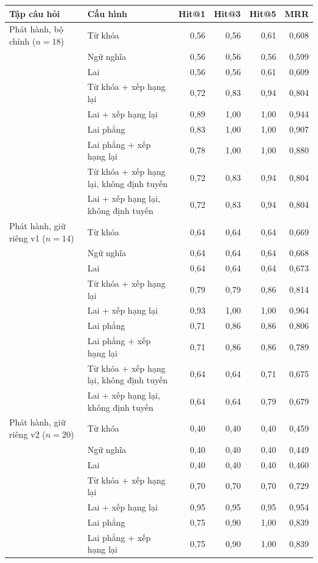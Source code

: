 \small
\begin{tabular}{@{}llrrrr@{}}
\toprule
Tập câu hỏi & Cấu hình & Hit@1 & Hit@3 & Hit@5 & MRR \\
\midrule
Phát hành, bộ chỉnh ($n=18$) & Từ khóa & 0,56 & 0,56 & 0,61 & 0,608 \\
 & Ngữ nghĩa & 0,56 & 0,56 & 0,56 & 0,599 \\
 & Lai & 0,56 & 0,56 & 0,61 & 0,609 \\
 & Từ khóa + xếp hạng lại & 0,72 & 0,83 & 0,94 & 0,804 \\
 & Lai + xếp hạng lại & 0,89 & 1,00 & 1,00 & 0,944 \\
 & Lai phẳng & 0,83 & 1,00 & 1,00 & 0,907 \\
 & Lai phẳng + xếp hạng lại & 0,78 & 1,00 & 1,00 & 0,880 \\
 & Từ khóa + xếp hạng lại, không định tuyến & 0,72 & 0,83 & 0,94 & 0,804 \\
 & Lai + xếp hạng lại, không định tuyến & 0,72 & 0,83 & 0,94 & 0,804 \\
\midrule
Phát hành, giữ riêng v1 ($n=14$) & Từ khóa & 0,64 & 0,64 & 0,64 & 0,669 \\
 & Ngữ nghĩa & 0,64 & 0,64 & 0,64 & 0,668 \\
 & Lai & 0,64 & 0,64 & 0,64 & 0,673 \\
 & Từ khóa + xếp hạng lại & 0,79 & 0,79 & 0,86 & 0,814 \\
 & Lai + xếp hạng lại & 0,93 & 1,00 & 1,00 & 0,964 \\
 & Lai phẳng & 0,71 & 0,86 & 0,86 & 0,806 \\
 & Lai phẳng + xếp hạng lại & 0,71 & 0,86 & 0,86 & 0,789 \\
 & Từ khóa + xếp hạng lại, không định tuyến & 0,64 & 0,64 & 0,71 & 0,675 \\
 & Lai + xếp hạng lại, không định tuyến & 0,64 & 0,64 & 0,79 & 0,679 \\
\midrule
Phát hành, giữ riêng v2 ($n=20$) & Từ khóa & 0,40 & 0,40 & 0,40 & 0,459 \\
 & Ngữ nghĩa & 0,40 & 0,40 & 0,40 & 0,449 \\
 & Lai & 0,40 & 0,40 & 0,40 & 0,460 \\
 & Từ khóa + xếp hạng lại & 0,70 & 0,70 & 0,70 & 0,729 \\
 & Lai + xếp hạng lại & 0,95 & 0,95 & 0,95 & 0,954 \\
 & Lai phẳng & 0,75 & 0,90 & 1,00 & 0,839 \\
 & Lai phẳng + xếp hạng lại & 0,75 & 0,90 & 1,00 & 0,839 \\

\end{tabular}
